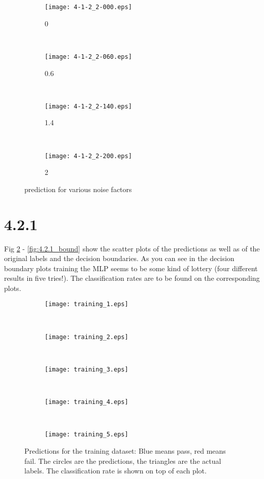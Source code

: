 \documentclass[a4paper,11pt]{article}
\theoremstyle{definition}
\theoremstyle{plain}
\theoremstyle{remark}
\begin{document}
\begin{figure}
\centering
\begin{subfigure}[b]{0.23\textwidth}
\centering
\texttt{[image: 4-1-2\_2-000.eps]}
\caption{0}
\end{subfigure}
~
\begin{subfigure}[b]{0.23\textwidth}
\centering
\texttt{[image: 4-1-2\_2-060.eps]}
\caption{0.6}
\end{subfigure}
~
\begin{subfigure}[b]{0.23\textwidth}
\centering
\texttt{[image: 4-1-2\_2-140.eps]}
\caption{1.4}
\end{subfigure}
~
\begin{subfigure}[b]{0.23\textwidth}
\centering
\texttt{[image: 4-1-2\_2-200.eps]}
\caption{2}
\end{subfigure}


\caption{prediction for various noise factors}
\label{fig:noise_pred}
\end{figure}


\section*{4.2.1}

Fig \ref{fig:4.2.1_train} - \ref{fig:4.2.1_bound} show the scatter plots of the predictions as well as of the original labels and the decision boundaries. As you can see in the decision boundary plots training the MLP seems to be some kind of lottery (four different results in five tries!). The classification rates are to be found on the corresponding plots.


\begin{figure}
\centering
\begin{subfigure}[b]{0.18\textwidth}
\centering
\texttt{[image: training\_1.eps]}
\caption{}
\end{subfigure}
~
\begin{subfigure}[b]{0.18\textwidth}
\centering
\texttt{[image: training\_2.eps]}
\caption{}
\end{subfigure}
~
\begin{subfigure}[b]{0.18\textwidth}
\centering
\texttt{[image: training\_3.eps]}
\caption{}
\end{subfigure}
~
\begin{subfigure}[b]{0.18\textwidth}
\centering
\texttt{[image: training\_4.eps]}
\caption{}
\end{subfigure}
~
\begin{subfigure}[b]{0.18\textwidth}
\centering
\texttt{[image: training\_5.eps]}
\caption{}
\end{subfigure}

\caption{Predictions for the training dataset: Blue means pass, red means fail. The circles are the predictions, the triangles are the actual labels. The classification rate is shown on top of each plot.}
\label{fig:4.2.1_train}
\end{figure}
\end{document}
